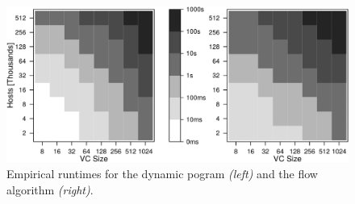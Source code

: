 \documentclass[preprint,12pt]{elsarticle}
\newcommand{\CostTrans}{\ensuremath{b_1}}
\newcommand{\CostCom}{\ensuremath{b_2}}
\begin{document}



%

%

\begin{figure}
\includegraphics[width=\columnwidth]{figs/heatmap}
\caption{Empirical runtimes for the dynamic pogram \textit{(left)} and the flow algorithm \textit{(right)}.} 
\label{fig:heatmap}
\end{figure}
\end{document}
